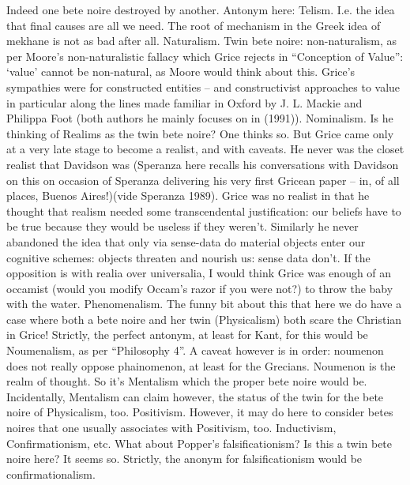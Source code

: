 \documentclass[10pt,titlepage]{book}
\begin{document}
Indeed  one bete noire destroyed by another. Antonym here: 
Telism. I.e. the idea that  final causes are all we need.  The  root of mechanism 
in the Greek idea of mekhane is not as bad after all.   
Naturalism. Twin  bete noire: non-naturalism, as per Moore’s 
non-naturalistic fallacy which Grice  rejects in “Conception of Value”: ‘value’ cannot 
be non-natural, as Moore would  think about this. Grice’s sympathies were for 
constructed entities – and  constructivist approaches to value in 
particular along the lines made familiar  in Oxford by J. L. Mackie and Philippa Foot 
(both authors he mainly focuses on  in (1991)). 
Nominalism. Is he  thinking of Realims as the twin bete noire? One thinks 
so. But Grice came only  at a very late stage to become a realist, and with 
caveats. He never was the  closet realist that Davidson was (Speranza here 
recalls his conversations with  Davidson on this on occasion of Speranza 
delivering his very first Gricean paper  – in, of all places, Buenos Aires!)(vide 
Speranza 1989). Grice was no realist in  that he thought that realism 
needed some transcendental justification: our  beliefs have to be true because 
they would be useless if they weren’t. Similarly  he never abandoned the idea 
that only via sense-data do material objects enter  our cognitive schemes: 
objects threaten and nourish us: sense data don’t. If the  opposition is with 
realia over universalia, I would think Grice was enough of an  occamist 
(would you modify Occam’s razor if you were not?) to throw the baby  with the 
water. 
Phenomenalism. The  funny bit about this that here we do have a case where 
both a bete noire and her  twin (Physicalism) both scare the Christian in 
Grice! Strictly, the perfect  antonym, at least for Kant, for this would be 
Noumenalism, as per “Philosophy  4”. A caveat however is in order: noumenon 
does not really oppose phainomenon,  at least for the Grecians. Noumenon is 
the realm of thought. So it’s Mentalism  which the proper bete noire would 
be. Incidentally, Mentalism can claim however,  the status of the twin for the 
bete noire of Physicalism,  too. 
Positivism.  However, it may do here to consider  betes noires that one 
usually associates with Positivism, too. Inductivism,  Confirmationism, etc. 
What about Popper’s falsificationism? Is this a twin bete  noire here? It 
seems so. Strictly, the anonym for falsificationism would be  confirmationalism. 
 
\end{document}
